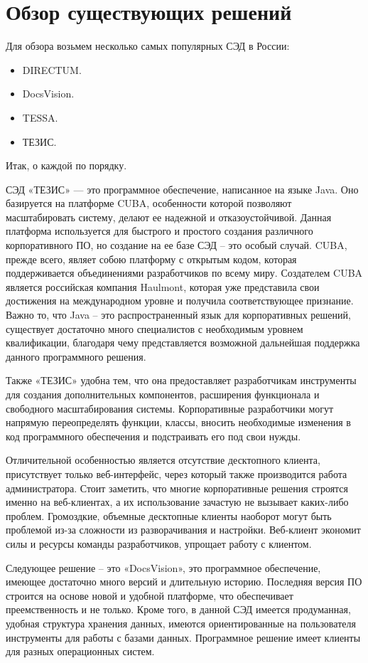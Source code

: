 \section{Обзор существующих решений} \label{subsec:ch1/sec2}
Для обзора возьмем несколько самых популярных СЭД в России:
\begin{itemize}
	\item DIRECTUM.
	\item DocsVision.
	\item TESSA.
	\item ТЕЗИС.
\end{itemize}
Итак, о каждой по порядку.

СЭД «ТЕЗИС» — это программное обеспечение, написанное на языке Java. Оно базируется на платформе CUBA, особенности которой позволяют масштабировать систему, делают ее надежной и отказоустойчивой. Данная платформа используется для быстрого и простого создания различного корпоративного ПО, но создание на ее базе СЭД – это особый случай. CUBA, прежде всего, являет собою платформу с открытым кодом, которая поддерживается объединениями разработчиков по всему миру. Создателем CUBA является российская компания Haulmont, которая уже представила свои достижения на международном уровне и получила соответствующее признание. Важно то, что Java – это распространенный язык для корпоративных решений, существует достаточно много специалистов с необходимым уровнем квалификации, благодаря чему представляется возможной дальнейшая поддержка данного программного решения. 

Также «ТЕЗИС» удобна тем, что она предоставляет разработчикам инструменты для создания дополнительных компонентов, расширения функционала и свободного масштабирования системы. Корпоративные разработчики могут напрямую переопределять функции, классы, вносить необходимые изменения в код программного обеспечения и подстраивать его под свои нужды. 

Отличительной особенностью является отсутствие десктопного клиента, присутствует только веб-интерфейс, через который также производится работа администратора. Стоит заметить, что многие корпоративные решения строятся именно на веб-клиентах, а их использование зачастую не вызывает каких-либо проблем. Громоздкие, объемные десктопные клиенты наоборот могут быть проблемой из-за сложности из разворачивания и настройки. Веб-клиент экономит силы и ресурсы команды разработчиков, упрощает работу с клиентом.

Следующее решение – это «DocsVision», это программное обеспечение, имеющее достаточно много версий и длительную историю. Последняя версия ПО строится на основе новой и удобной платформе, что обеспечивает преемственность и не только. Кроме того, в данной СЭД имеется продуманная, удобная структура хранения данных, имеются ориентированные на пользователя инструменты для работы с базами данных. Программное решение имеет клиенты для разных операционных систем. 

